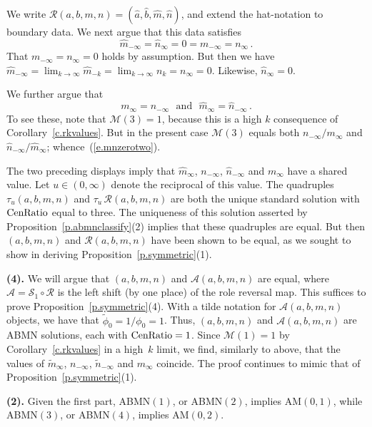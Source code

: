\documentclass[letterpaper,11pt,oneside,reqno]{amsbook}
\numberwithin{figure}{chapter}
\theoremstyle{definition}
\theoremstyle{definition}
\theoremstyle{definition}
\theoremstyle{definition}
\theoremstyle{definition}
\newcommand{\mc}{\mathcal}
\newcommand{\centralratio}{{\rm CenRatio}}
\newcommand{\minamm}{\mathcal{M}}
\newcommand{\abmnmac}{\textrm{ABMN}}
\newcommand{\ammac}{\textrm{AM}}
\newcommand{\abmnmacspace}{\textrm{ABMN} }
\begin{document}
We write $\mc{R}(a,b,m,n) = (\hat{a},\hat{b},\hat{m},\hat{n})$, and extend the hat-notation to boundary data.
We next argue that this data satisfies
\begin{equation}\label{e.mnzeromn}
 \hat{m}_{-\infty} = \hat{n}_\infty = 0 = m_{-\infty} = n_\infty \, .
\end{equation}
That $m_{-\infty} = n_\infty=0$ holds by assumption. But then we have $\hat{m}_{-\infty} = \lim_{k \to \infty} \hat{m}_{-k} = \lim_{k \to \infty} n_k = n_\infty = 0$. Likewise, $\hat{n}_\infty = 0$.

We further 
argue that
\begin{equation}\label{e.mnzerotwo}
 m_\infty = n_{-\infty} \, \, \, \, \textrm{and} \, \, \, \, \hat{m}_\infty =  \hat{n}_{-\infty}  \, .
\end{equation}
To see these, note that $\minamm(3)=1$, because this is a high $k$ consequence of Corollary~\ref{c.rkvalues}. 
But in the present case $\minamm(3)$ equals   both $n_{-\infty}/m_\infty$ and  $\hat{n}_{-\infty}/\hat{m}_\infty$; whence~(\ref{e.mnzerotwo}). 

The two preceding displays imply that $\hat{m}_\infty$, $n_{-\infty}$,  $\hat{n}_{-\infty}$ and $m_\infty$
have a shared value. Let $u \in (0,\infty)$ denote the reciprocal of this value. The quadruples $\tau_u (a,b,m,n)$ and $\tau_u \, \mc{R}(a,b,m,n)$
are both the unique standard solution with $\centralratio$ equal to three.
 The uniqueness of this solution asserted by Proposition~\ref{p.abmnclassify}(2) implies that these quadruples are equal. But then $(a,b,m,n)$ and $\mc{R}(a,b,m,n)$ have been shown to be equal, as we sought to show in deriving Proposition~\ref{p.symmetric}(1).
 
 {\bf (4).} We will argue that $(a,b,m,n)$ and $\mc{A}(a,b,m,n)$ are equal, where $\mc{A} = \mc{S}_1 \circ \mc{R}$ is the left shift (by one place) of the role reversal map. This suffices to prove
  Proposition~\ref{p.symmetric}(4). With a tilde notation for $\mc{A}(a,b,m,n)$ objects, we have that $\tilde\phi_0 = 1/\phi_0 =1$. Thus,  $(a,b,m,n)$ and $\mc{A}(a,b,m,n)$ are \abmnmacspace solutions, each with $\centralratio = 1$. Since $\minamm(1)=1$ by Corollary~\ref{c.rkvalues} in a high~$k$ limit, we find, similarly to above, that  the values of $\tilde{m}_\infty$, $n_{-\infty}$,  $\tilde{n}_{-\infty}$ and $m_\infty$ coincide. 
  The proof continues to mimic that of  Proposition~\ref{p.symmetric}(1).
  
  {\bf (2).} Given the first part, \abmnmac$(1)$, or \abmnmac$(2)$, implies \ammac$(0,1)$, while \abmnmac$(3)$, or \abmnmac$(4)$, implies \ammac$(0,2)$.
  
\end{document}
